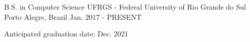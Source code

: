 \begin{cventries}
  \cventry
    {B.S. in Computer Science}
    {UFRGS - Federal University of Rio Grande do Sul}
    {Porto Alegre, Brazil}
    {Jan. 2017 - PRESENT}
    {
      \begin{cvitems}
        \item {Anticipated graduation date: Dec. 2021}
      \end{cvitems}
    }
\end{cventries}
